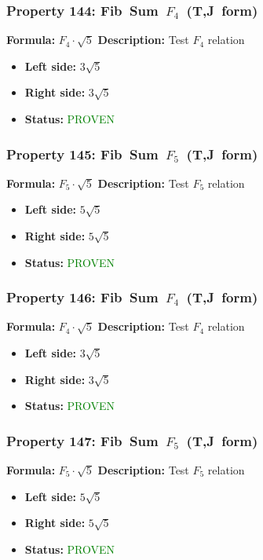 \subsubsection*{Property 144: Fib~Sum~$F_{4}$~(T,J~form)}
\textbf{Formula:} $F_4 \cdot \sqrt{5}$
\textbf{Description:} Test $F_{4}$ relation

\begin{itemize}
\item \textbf{Left side:} $3 \sqrt{5}$
\item \textbf{Right side:} $3 \sqrt{5}$
\item \textbf{Status:} \textcolor{green}{PROVEN}
\end{itemize}

\subsubsection*{Property 145: Fib~Sum~$F_{5}$~(T,J~form)}
\textbf{Formula:} $F_5 \cdot \sqrt{5}$
\textbf{Description:} Test $F_{5}$ relation

\begin{itemize}
\item \textbf{Left side:} $5 \sqrt{5}$
\item \textbf{Right side:} $5 \sqrt{5}$
\item \textbf{Status:} \textcolor{green}{PROVEN}
\end{itemize}

\subsubsection*{Property 146: Fib~Sum~$F_{4}$~(T,J~form)}
\textbf{Formula:} $F_4 \cdot \sqrt{5}$
\textbf{Description:} Test $F_{4}$ relation

\begin{itemize}
\item \textbf{Left side:} $3 \sqrt{5}$
\item \textbf{Right side:} $3 \sqrt{5}$
\item \textbf{Status:} \textcolor{green}{PROVEN}
\end{itemize}

\subsubsection*{Property 147: Fib~Sum~$F_{5}$~(T,J~form)}
\textbf{Formula:} $F_5 \cdot \sqrt{5}$
\textbf{Description:} Test $F_{5}$ relation

\begin{itemize}
\item \textbf{Left side:} $5 \sqrt{5}$
\item \textbf{Right side:} $5 \sqrt{5}$
\item \textbf{Status:} \textcolor{green}{PROVEN}
\end{itemize}

